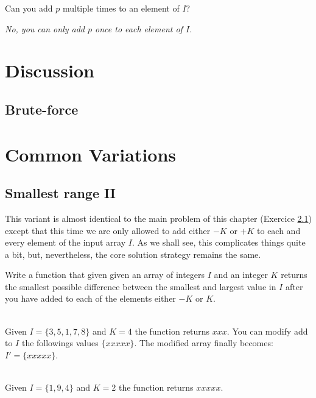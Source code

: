 \begin{QandA}
	\item Can you add $p$ multiple times to an element of $I$?
	\begin{answered}
		\textit{No, you can only add $p$ once to each element of $I$.}
	\end{answered}	
\end{QandA}

\section{Discussion}
\label{smallest_range:sec:discussion}


\subsection{Brute-force}
\label{smallest_range:sec:bruteforce}

\begin{minipage}{\linewidth}
	
\end{minipage}


\section{Common Variations}
\subsection{Smallest range \RN{2} }
This variant is almost identical to the main problem of this chapter (Exercice \ref{}) except that this time
we are only allowed to add either $-K$ or $+K$ to each and every element of the input array $I$. As we shall see, this complicates things quite a bit,
but, nevertheless, the core solution strategy  remains the same. 

\begin{exercise}
	\label{example:smallest_range:variation1:exercice1}
	Write a function that given given an array of integers $I$ and an integer $K$ 
	returns the smallest possible difference between the smallest and largest value in $I$
	after you have added to each of the elements either $-K$ or $K$.
	
		\begin{example}
			\label{example:smallest_range:variation1:example1}
			\hfill \\
			Given $I = \{3,5,1,7,8\}$ and $K=4$ the function returns $xxx$. You can modify add to $I$ the followings values
			$\{xxxxx\}$. The modified array finally becomes: $I'=\{xxxxx\}$. 
			
		\end{example}
	
		\begin{example}
			\label{example:smallest_range:variation1:example2}
			\hfill \\
			Given $I = \{1,9,4\}$ and $K=2$ the function returns $xxxxx$.
		\end{example}
	
	\end{exercise}

